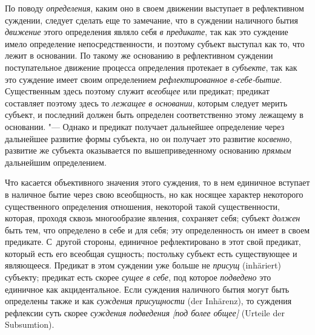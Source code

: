 {По поводу
{\em определения}, каким
оно в своем движении выступает в рефлективном суждении, следует сделать еще
то замечание, что в суждении наличного бытия
{\em движение} этого определения являло себя {\em в предикате},
так как это суждение имело определение
непосредственности, и поэтому субъект выступал как то, что лежит в
основании. По такому же основанию в рефлективном суждении
поступательное движение процесса определения протекает в
{\em субъекте}, так как
это суждение имеет своим определением
{\em рефлектированное в-себе-бытие}.
Существенным здесь поэтому служит
{\em всеобщее} или
предикат; предикат составляет поэтому здесь то
{\em лежащее в основании},
которым следует мерить субъект, и последний должен быть
определен соответственно этому лежащему в основании. "---
Однако и предикат получает дальнейшее определение через
дальнейшее развитие формы субъекта, но он получает это развитие
{\em косвенно}, развитие
же субъекта оказывается по вышеприведенному основанию
{\em прямым} дальнейшим определением.

Что касается объективного значения этого суждения, то в нем
единичное вступает в наличное бытие через свою всеобщность, но как носящее
характер некоторого существенного определения отношения, некоторой такой
существенности, которая, проходя сквозь многообразие явления, сохраняет
себя; субъект {\em должен}
быть тем, что определено в себе и для себя; эту
определенность он имеет в своем предикате. С~другой стороны, единичное
рефлектировано в этот свой предикат, который есть его всеобщая сущность;
постольку субъект есть существующее и являющееся. Предикат в этом суждении
уже больше не {\em присущ} (inhäriert) субъекту; предикат есть скорее
{\em сущее в себе}, под которое {\em подведено}
это единичное как акцидентальное. Если суждения наличного
бытия могут быть определены также и как
{\em суждения присущности} (der
Inhärenz), то суждения рефлексии суть скорее
{\em суждения подведения [под более общее]} (Urteile der Subsumtion).

}
